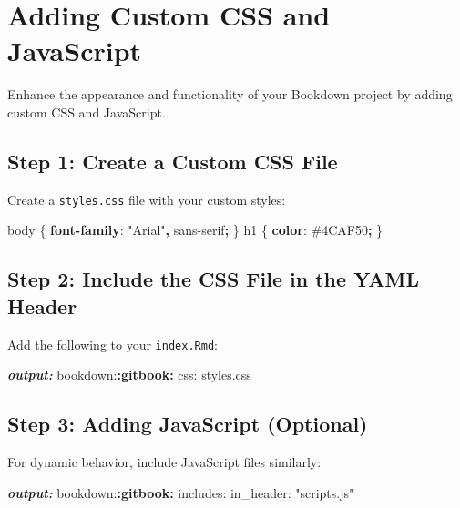 \documentclass[
]{book}
\newenvironment{Shaded}{\begin{snugshade}}{\end{snugshade}}
\newcommand{\AnnotationTok}[1]{\textcolor[rgb]{0.56,0.35,0.01}{\textbf{\textit{#1}}}}
\newcommand{\CharTok}[1]{\textcolor[rgb]{0.31,0.60,0.02}{#1}}
\newcommand{\ConstantTok}[1]{\textcolor[rgb]{0.56,0.35,0.01}{#1}}
\newcommand{\DecValTok}[1]{\textcolor[rgb]{0.00,0.00,0.81}{#1}}
\newcommand{\KeywordTok}[1]{\textcolor[rgb]{0.13,0.29,0.53}{\textbf{#1}}}
\newcommand{\NormalTok}[1]{#1}
\newcommand{\OperatorTok}[1]{\textcolor[rgb]{0.81,0.36,0.00}{\textbf{#1}}}
\newcommand{\SpecialCharTok}[1]{\textcolor[rgb]{0.81,0.36,0.00}{\textbf{#1}}}
\newcommand{\StringTok}[1]{\textcolor[rgb]{0.31,0.60,0.02}{#1}}
\theoremstyle{definition}
\theoremstyle{definition}
\theoremstyle{definition}
\theoremstyle{definition}
\theoremstyle{remark}
\begin{document}
\section{Adding Custom CSS and JavaScript}\label{adding-custom-css-and-javascript}

Enhance the appearance and functionality of your Bookdown project by adding custom CSS and JavaScript.

\subsection{Step 1: Create a Custom CSS File}\label{step-1-create-a-custom-css-file}

Create a \texttt{styles.css} file with your custom styles:

\begin{Shaded}
\begin{Highlighting}[]
\NormalTok{body \{}
  \KeywordTok{font{-}family}\CharTok{:} \StringTok{"Arial"}\OperatorTok{,} \DecValTok{sans{-}serif}\OperatorTok{;}
\NormalTok{\}}
\NormalTok{h1 \{}
  \KeywordTok{color}\CharTok{:} \ConstantTok{\#4CAF50}\OperatorTok{;}
\NormalTok{\}}
\end{Highlighting}
\end{Shaded}

\subsection{Step 2: Include the CSS File in the YAML Header}\label{step-2-include-the-css-file-in-the-yaml-header}

Add the following to your \texttt{index.Rmd}:

\begin{Shaded}
\begin{Highlighting}[]
\AnnotationTok{output:}
\NormalTok{  bookdown:}\SpecialCharTok{:gitbook:}
\NormalTok{    css: styles.css}
\end{Highlighting}
\end{Shaded}

\subsection{Step 3: Adding JavaScript (Optional)}\label{step-3-adding-javascript-optional}

For dynamic behavior, include JavaScript files similarly:

\begin{Shaded}
\begin{Highlighting}[]
\AnnotationTok{output:}
\NormalTok{  bookdown:}\SpecialCharTok{:gitbook:}
\NormalTok{    includes:}
\NormalTok{      in\_header: "scripts.js"}
\end{Highlighting}
\end{Shaded}
\end{document}

